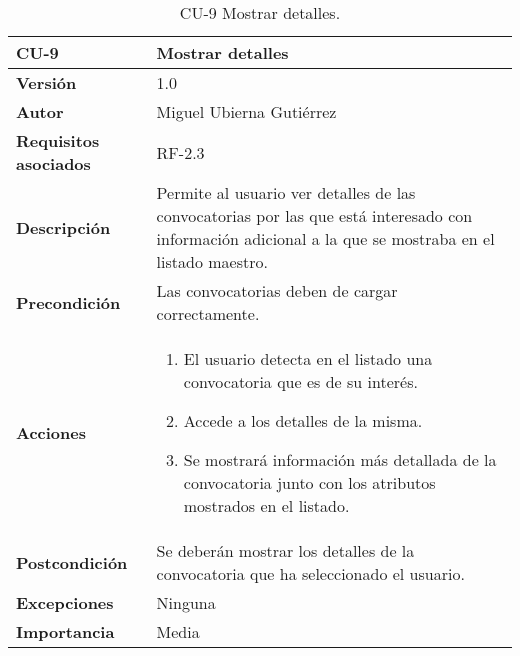 \begin{table}[p]
	\centering
	\begin{tabularx}{\linewidth}{ p{} p{} }
		\toprule
		\textbf{CU-9}    & \textbf{Mostrar detalles}\\
		\toprule
		\textbf{Versión}              & 1.0    \\
		\textbf{Autor}                & Miguel Ubierna Gutiérrez \\
		\textbf{Requisitos asociados} & RF-2.3 \\
		\textbf{Descripción}          & Permite al usuario ver detalles de las convocatorias por las que está interesado con información adicional a la que se mostraba en el listado maestro.  \\
		\textbf{Precondición}         & Las convocatorias deben de cargar correctamente.\\
		\textbf{Acciones}             &
		\begin{enumerate}
			\def\labelenumi{\arabic{enumi}.}
			\tightlist
			\item El usuario detecta en el listado una convocatoria que es de su interés.
                \item Accede a los detalles de la misma.
                \item Se mostrará información más detallada de la convocatoria junto con los atributos mostrados en el listado.
		\end{enumerate}\\
		\textbf{Postcondición}        & Se deberán mostrar los detalles de la convocatoria que ha seleccionado el usuario. \\
		\textbf{Excepciones}          & Ninguna  \\
		\textbf{Importancia}          & Media  \\
		\bottomrule
	\end{tabularx}
	\caption{CU-9 Mostrar detalles.}
\end{table}

